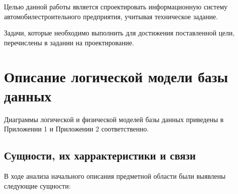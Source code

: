 Целью данной работы является спроектировать информационную систему автомобилестроительного предприятия, учитывая техническое задание.

Задачи, которые необходимо выполнить для достижения поставленной цели, перечислены в задании на проектирование.

\newpage

\section{Описание логической модели базы данных}

Диаграммы логической и физической моделей базы данных приведены в Приложении 1 и Приложении 2 соответственно.

\subsection{Сущности, их харрактеристики и связи}
В ходе анализа начального описания предметной области были выявлены следующие сущности:


